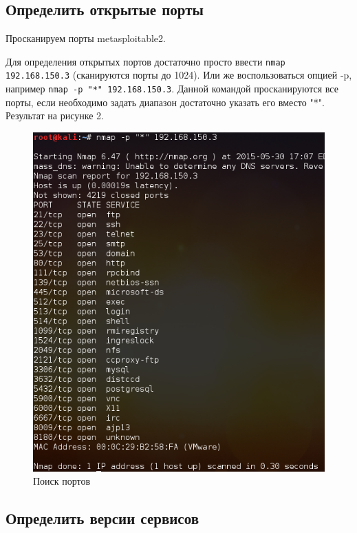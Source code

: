 \documentclass[11pt, a4paper]{article}		%
\begin{document}

\subsection{Определить открытые порты}

Просканируем порты metasploitable2.

Для определения открытых портов достаточно просто ввести \verb'nmap 192.168.150.3' (сканируются порты до 1024). Или же воспользоваться опцией -p, например \verb'nmap -p "*" 192.168.150.3'. Данной командой просканируются все порты, если необходимо задать диапазон достаточно указать его вместо "*".
Результат на рисунке 2.

\begin{figure}[h!]
\centering
\includegraphics[scale=0.8]{res/ports_scan}
\caption{Поиск портов}
\end{figure}


\subsection{Определить версии сервисов}
\end{document}
